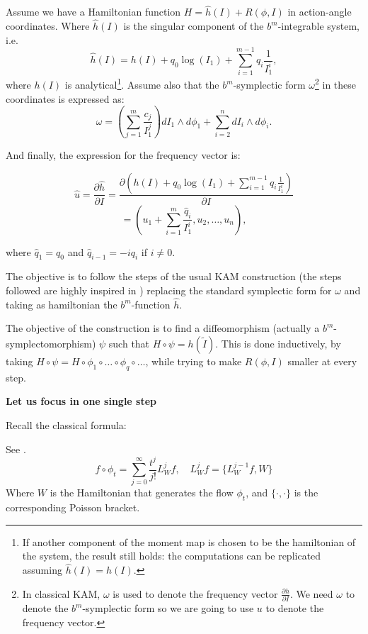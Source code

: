 Assume we have a Hamiltonian function $H = \hat{h}(I) + R(\phi,I)$ in action-angle coordinates. Where $\hat{h}(I)$ is the singular component of the $b^m$-integrable system, i.e.
\begin{equation}\label{eq:bm-hamiltonian}
\hat{h}(I) = h(I) + q_0 \log(I_1) + \sum_{i = 1}^{m-1}q_i\frac{1}{I_1^i},
\end{equation}
where $h(I)$ is analytical\footnote{If another component of the moment map is chosen to be the hamiltonian of the system, the result still holds: the computations can be replicated assuming $\hat{h}(I) = h(I)$.}.
Assume also that the $b^m$-symplectic form $\omega$\footnote{In classical KAM, $\omega$ is used to denote the frequency vector $\frac{\partial h}{\partial I}$. We need $\omega$ to denote the $b^m$-symplectic form so we are going to use $u$ to denote the frequency vector.} in these coordinates is expressed as:
\begin{equation}\label{eq:bm-symplectic}
\omega = \left(\sum_{j = 1}^m\frac{c_{j}}{I_1^j}\right)dI_1\wedge d \phi_1 + \sum_{i=2}^{n}dI_i\wedge d\phi_i.
\end{equation}

And finally, the expression for the frequency vector is:

$$\hat{u} = \frac{\partial \hat{h}}{\partial I} = \frac{\partial(h(I) + q_0 \log(I_1) + \sum_{i = 1}^{m-1}q_i\frac{1}{I_1^i})}{\partial I}$$ $$= \left(u_1 + \sum_{i = 1}^{m}\frac{\hat{q}_i}{I_1^i}, u_2, \ldots, u_n\right),
$$

where $\hat{q}_1 = q_0$ and $\hat{q}_{i-1} = -iq_i$ if $i \neq 0$.

The objective is to follow the steps of the usual KAM construction (the steps followed are highly inspired in \cite{D}) replacing the standard symplectic form for $\omega$ and taking as hamiltonian the $b^m$-function $\hat{h}$.

\begin{remark}
The objective of the construction is to find a diffeomorphism (actually a $b^m$-symplectomorphism) $\psi$ such that $H\circ\psi=h(\tilde{I})$. This is done inductively, by taking $H\circ\psi=H \circ \phi_1\circ\ldots\circ \phi_q \circ\ldots$, while trying to make $R(\phi,I)$ smaller at every step.
\end{remark}

\textbf{Let us focus in one single step}

Recall the classical formula:

\begin{lemma}\label{lemma:lie_taylor} See \cite{D}.
$$f\circ\phi_t=\sum_{j=0}^{\infty}\frac{t^j}{j!}L_W^jf,\quad L_W^jf=\{L_W^{j-1}f,W\}$$
Where $W$ is the Hamiltonian that generates the flow $\phi_t$, and $\{\cdot,\cdot\}$ is the corresponding Poisson bracket.
\end{lemma}


